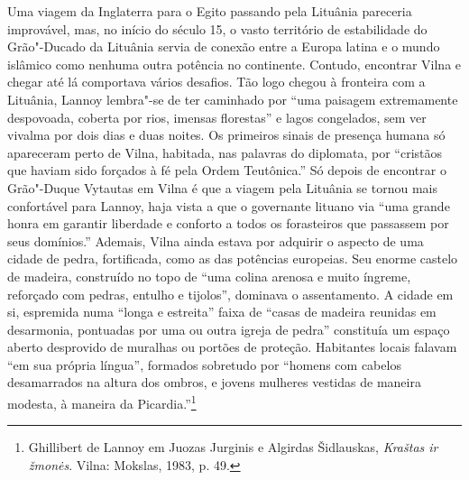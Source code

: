 Uma viagem da Inglaterra para o Egito passando pela Lituânia pareceria
improvável, mas, no início do século 15, o vasto território de
estabilidade do Grão"-Ducado da Lituânia servia de conexão entre a Europa
latina e o mundo islâmico como nenhuma outra potência no continente.
Contudo, encontrar Vilna e chegar até lá comportava vários desafios. Tão
logo chegou à fronteira com a Lituânia, Lannoy lembra"-se de ter
caminhado por ``uma paisagem extremamente despovoada, coberta por rios,
imensas florestas'' e lagos congelados, sem ver vivalma por dois dias e
duas noites. Os primeiros sinais de presença humana só apareceram perto
de Vilna, habitada, nas palavras do diplomata, por ``cristãos que haviam
sido forçados à fé pela Ordem Teutônica.'' Só depois de encontrar o
Grão"-Duque Vytautas em Vilna é que a viagem pela Lituânia se tornou mais
confortável para Lannoy, haja vista a que o governante lituano via ``uma
grande honra em garantir liberdade e conforto a todos os forasteiros que
passassem por seus domínios.'' Ademais, Vilna ainda estava por adquirir
o aspecto de uma cidade de pedra, fortificada, como as das potências
europeias. Seu enorme castelo de madeira, construído no topo de ``uma
colina arenosa e muito íngreme, reforçado com pedras, entulho e
tijolos'', dominava o assentamento. A cidade em si, espremida numa
``longa e estreita'' faixa de ``casas de madeira reunidas em desarmonia,
pontuadas por uma ou outra igreja de pedra'' constituía um espaço aberto
desprovido de muralhas ou portões de proteção. Habitantes locais falavam
``em sua própria língua'', formados sobretudo por ``homens com cabelos
desamarrados na altura dos ombros, e jovens mulheres vestidas de maneira
modesta, à maneira da Picardia.''\footnote{Ghillibert de Lannoy em Juozas Jurginis e Algirdas Šidlauskas, \textit{Kraštas ir žmonės}. Vilna: Mokslas, 1983, p. 49.}
%


